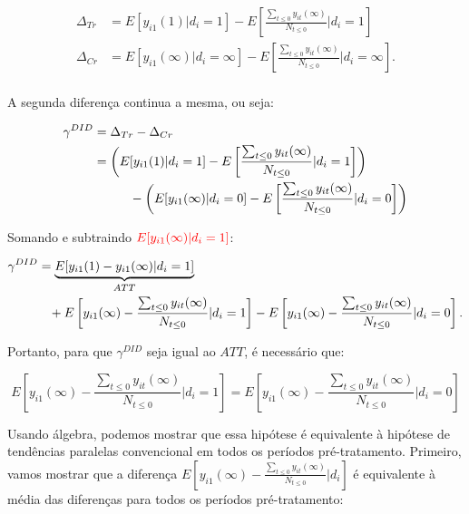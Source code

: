 \documentclass[portugues]{article}
\begin{document}
\[
\begin{split}
    \Delta_{Tr} &= E[y_{i1}(1)|d_i=1] - E\left[\frac{\sum_{t\leq 0} y_{it}(\infty)}{N_{t\leq 0}}|d_i=1\right] \\
    \Delta_{Cr} &= E[y_{i1}(\infty)|d_i=\infty] - E\left[\frac{\sum_{t\leq 0} y_{it}(\infty)}{N_{t\leq 0}}|d_i=\infty\right]. \\
\end{split}
\]

\noindent A segunda diferença continua a mesma, ou seja:

\[\begin{split}
    \gamma^{DID} & = \Delta_{Tr} - \Delta_{Cr} \\
    & = \left(E[y_{i1}(1) | d_i = 1] - E\left[\frac{\sum_{t\leq0} y_{it}(\infty)}{N_{t\leq0}} | d_i = 1\right]\right) \\
    & \hspace{10mm}- \left(E[y_{i1}(\infty) | d_i = 0] - E\left[\frac{\sum_{t\leq0} y_{it}(\infty)}{N_{t\leq0}} | d_i = 0\right]\right)\\
\end{split}
\]

Somando e subtraindo  $\textcolor{red}{E[y_{i1}(\infty) | d_i = 1]}$:

\begin{equation*}
    \begin{split}
     \gamma^{DID} & = \underbrace{E[y_{i1}(1) - y_{i1}(\infty) | d_i = 1]}_{ATT} \\
     & \hspace{3mm} + E\left[y_{i1}(\infty) - \frac{\sum_{t\leq0} y_{it}(\infty)}{N_{t\leq0}} | d_i = 1\right] - E\left[y_{i1}(\infty) - \frac{\sum_{t\leq0} y_{it}(\infty)}{N_{t\leq0}} | d_i = 0\right].
\end{split}
\end{equation*}

Portanto, para que $\gamma^{DID}$ seja igual ao $ATT$, é necessário que:

\begin{equation}\label{eq:TP_mult_pre_0}
     E\left[y_{i1}(\infty) - \frac{\sum_{t\leq0} y_{it}(\infty)}{N_{t\leq0}} | d_i = 1\right] = E\left[y_{i1}(\infty) - \frac{\sum_{t\leq0} y_{it}(\infty)}{N_{t\leq0}} | d_i = 0\right]
\end{equation}

Usando álgebra, podemos mostrar que essa hipótese é equivalente à hipótese de tendências paralelas convencional em todos os períodos pré-tratamento. Primeiro, vamos mostrar que a diferença $E\left[y_{i1}(\infty) - \frac{\sum_{t\leq0} y_{it}(\infty)}{N_{t\leq0}} | d_i\right]$ é equivalente à média das diferenças para todos os períodos pré-tratamento:
\end{document}

